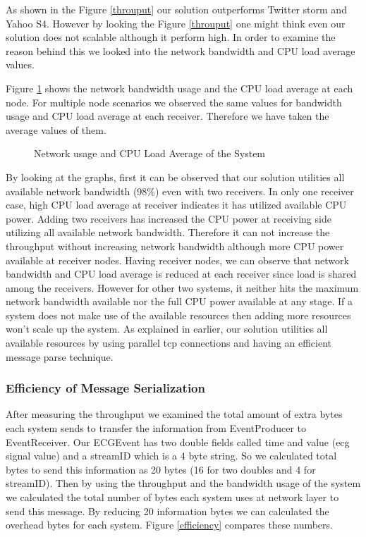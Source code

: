 As shown in the Figure \ref{throuput} our solution outperforms Twitter storm\cite{twitterStorm} and Yahoo S4\cite{neumeyer2010s4}. However by looking the Figure \ref{throuput} one might think even our solution does not scalable although it perform high. In order to examine the reason behind this we looked into the network bandwidth and CPU load average values. 
 
Figure \ref{networkandload} shows the network bandwidth usage and the CPU load average at each node. For multiple node scenarios we observed the same values for bandwidth usage and CPU load average at each receiver. Therefore we have taken the average values of them. 

\begin{figure}[!t]
	\centering
	\hfil
	\caption{Network usage and CPU Load Average of the System}
	\label{networkandload}
\end{figure}
 

By looking at the graphs, first it can be observed that our solution utilities all available network bandwidth (98\%) even with two receivers. In only one receiver case, high CPU load average at receiver indicates it has utilized available CPU power. Adding two receivers has increased the CPU power at receiving side utilizing all available network bandwidth. Therefore it can not increase the throughput without increasing network bandwidth although more CPU power available at receiver nodes. Having receiver nodes, we can observe that network bandwidth and CPU load average is reduced at each receiver since load is shared among the receivers. However for other two systems, it neither hits the maximum network bandwidth available nor the full CPU power available at any stage. If a system does not make use of the available resources then adding more resources won't scale up the system. As explained in earlier, our solution utilities all available resources by using parallel tcp connections and having an efficient 
message parse technique.

\subsubsection{Efficiency of Message Serialization}
After measuring the throughput we examined the  total amount of extra bytes each system sends to transfer the information from EventProducer to EventReceiver. Our ECGEvent has two double fields called time and value (ecg signal value) and a streamID which is a 4 byte string. So we calculated total bytes to send this information as 20 bytes (16 for two doubles and 4 for streamID). Then by using the throughput and the bandwidth usage of the system we calculated the total number of bytes each system uses at network layer to send this message. By reducing 20 information bytes we can calculated the overhead bytes for each system. Figure \ref{efficiency} compares these numbers.

